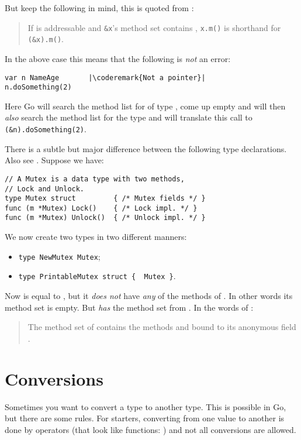 But keep the following in mind, this is quoted from \cite{go_spec}:
\begin{quote}
If  is
addressable and \lstinline{&x}'s method set contains , 
\lstinline{x.m()} is shorthand for \mbox{\lstinline{(&x).m()}}.
\end{quote}
In the above case this means that the following is \emph{not} an 
error:
\begin{lstlisting}
var n NameAge	    |\coderemark{Not a pointer}|
n.doSomething(2)    
\end{lstlisting}
Here Go will search the method list for  of type ,
come up empty and will then \emph{also} search the method list for
the type  and will translate this call to
\lstinline{(&n).doSomething(2)}.

There is a subtle but major difference between the following type
declarations. Also see \cite[section~``Type Declarations'']{go_spec}.
Suppose we have:
\begin{lstlisting}
// A Mutex is a data type with two methods,
// Lock and Unlock.
type Mutex struct         { /* Mutex fields */ }
func (m *Mutex) Lock()    { /* Lock impl. */ }
func (m *Mutex) Unlock()  { /* Unlock impl. */ }
\end{lstlisting}
We now create two types in two different manners:
\begin{itemize}
\item \lstinline|type NewMutex Mutex|;
\item \lstinline|type PrintableMutex struct {  Mutex }|.
\end{itemize}
Now  is equal to , but
it \emph{does not} have \emph{any} of the methods of . In other words
its method set is empty.
But  \emph{has}  the 
method set from .
In the words of \cite{go_spec}:
\begin{quote}
The method set of  contains the methods
 and  bound to its anonymous field .
\end{quote}

\section{Conversions}
\label{sec:conversions}
Sometimes you want to convert a type to another type. 
This is possible in Go, but
there are some rules. For starters, converting from one value to another
is done by operators (that look like functions: ) and not all conversions are allowed.

